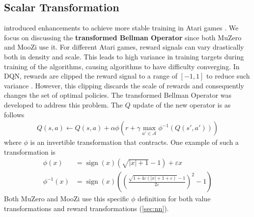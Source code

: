 \subsection{Scalar Transformation} \label{sec:scalar_transform}
\citeauthor{ObserveLookFurther_Pohlen.Piot.ea_2018} introduced enhancements to achieve more stable training in Atari games \cite{ObserveLookFurther_Pohlen.Piot.ea_2018}.
We focus on discussing the \textbf{transformed Bellman Operator} since both MuZero and MooZi use it.
For different Atari games, reward signals can vary drastically both in density and scale.
This leads to high variance in training targets during training of the algorithms, causing algorithms to have difficulty converging.
In DQN, rewards are clipped the reward signal to a range of $[-1, 1]$ to reduce such variance \cite{PlayingAtariDeep_Mnih.Kavukcuoglu.ea_2013}.
However, this clipping discards the scale of rewards and consequently changes the set of optimal policies.
The transformed Bellman Operator was developed to address this problem.
The $Q$ update of the new operator is as follows
\begin{align*}
    Q(s, a) \leftarrow Q(s, a) + \alpha \phi \left(r +\gamma \max _{a' \in \mathcal{A}} \phi^{-1}\left(Q\left(s', a'\right)\right)\right)
\end{align*}
where $\phi$ is an invertible transformation that contracts.
One example of such a transformation is
\begin{align*}
    \phi(x)       & = \operatorname{sign}(x)\left(\sqrt{|x|+1}-1\right)+\varepsilon x  \\
    \phi^{-1}(x)  & = \operatorname{sign}(x)\left(\left(\frac{\sqrt{1+4 \varepsilon(|x|+1+\varepsilon)}-1}{2 \varepsilon}\right)^{2}-1\right)
\end{align*}
Both MuZero and MooZi use this specific $\phi$ definition for both value transformations and reward transformations (\ref{sec:nn}).


